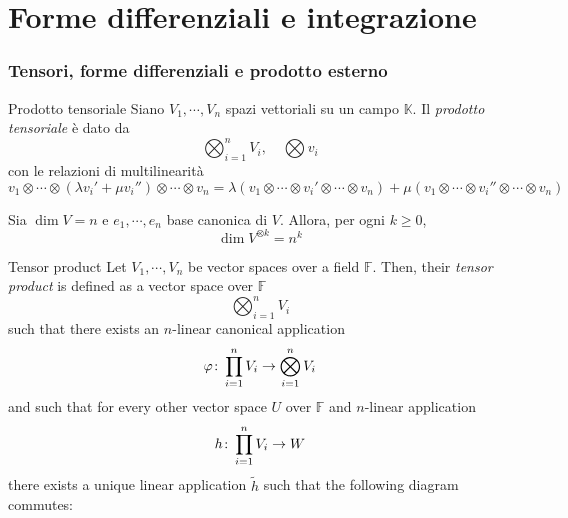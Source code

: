 \documentclass[a4paper]{article}
\begin{document}
\part{Forme differenziali e integrazione}

\section{Tensori, forme differenziali e prodotto esterno}

\begin{snippetdefinition}{Prodotto tensoriale}
    Siano \(V_1, \cdots, V_n\)
    spazi vettoriali su un campo \(\mathbb K\).
    Il \emph{prodotto tensoriale} è dato da \[
        \bigotimes_{i=1}^n V_i,
        \quad \bigotimes v_i
    \]
    con le relazioni di multilinearità
    \[
        v_1 \otimes \cdots \otimes (\lambda v_i' + \mu v_i'') \otimes \cdots \otimes v_n
        = \lambda(v_1 \otimes \cdots \otimes v_i' \otimes \cdots \otimes v_n)
        + \mu(v_1 \otimes \cdots \otimes v_i'' \otimes \cdots \otimes v_n)
    \]
\end{snippetdefinition}

\begin{snippetproposition}{}
    Sia \(\dim V = n\) e \(e_1, \cdots, e_n\)
    base canonica di \(V\). Allora, per ogni \(k\geq 0\),
    \[
        \dim V^{\otimes k} =
        n^k
    \]
\end{snippetproposition}

\begin{radioactive}
\begin{snippetdefinition}{Tensor product}
    Let \(V_1, \cdots, V_n\) be vector spaces
    over a field \(\mathbb F\). Then, their \emph{tensor product}
    is defined as a vector space over \(\mathbb F\) 
    \[
        \bigotimes_{i=1}^n V_i
    \]
    such that there exists an \(n\)-linear canonical application
    \[
        \varphi \colon \prod_{i=1}^n V_i \to \bigotimes_{i=1}^n V_i
    \]
    and such that for every other vector space \(U\) over \(\mathbb F\)
    and \(n\)-linear application \[
        h \colon \prod_{i=1}^n V_i \to W
    \]
    there exists a unique linear application \(\tilde h\) such that the following diagram commutes:
    \begin{center}
    \end{center}
\end{snippetdefinition}
\end{radioactive}
\end{document}
